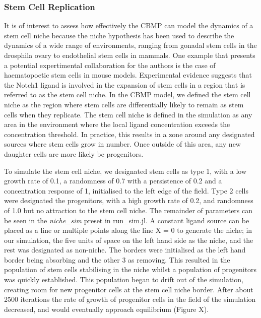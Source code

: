\documentclass[11.5pt]{article}
\begin{document}
\begin{figure}[H]
\centering
\end{figure}


\subsubsection{Stem Cell Replication}
It is of interest to assess how effectively the CBMP can model the 
dynamics of a stem cell niche because the niche hypothesis has been used 
to describe the dynamics of a wide range of environments, ranging from 
gonadal stem cells in the drosphila ovary to endothelial stem cells in 
mammals. One example that presents a potential expertimental 
collaboration for the authors is the case of haematopoetic stem cells in 
mouse models. Experimental evidence suggests that the Notch1 ligand is 
involved in the expansion of stem cells in a region that is referred to 
as the stem cell niche. In the CBMP model, we defined the stem cell 
niche as the region where stem cells are differentially likely to remain 
as stem cells when they replicate. The stem cell niche is defined in the 
simulation as any area in the environment where the local ligand 
concentration exceeds the concentration threshold. In practice, this 
results in a zone around any designated sources where stem cells grow in 
number. Once outside of this area, any new daughter cells are more 
likely be progenitors. 



To simulate the stem cell niche, we designated stem cells as type 1, 
with a low growth rate of 0.1, a randomness of 0.7 with a persistence of 
0.2 and a concentration response of 1, initialised to the left edge of 
the field. Type 2 cells were designated the progenitors, with a high 
growth rate of 0.2, and randomness of 1.0 but no attraction to the stem 
cell niche. The remainder of parameters can be seen in the {\itshape 
niche\_sim} preset in run\_sim.jl. A constant ligand source can be 
placed as a line or multiple points along the line X = 0 to generate the 
niche; in our simulation, the five units of space on the left hand side 
as the niche, and the rest was designated as non-niche. The borders were 
initialised as the left hand border being absorbing and the other 3 as 
removing. This resulted in the population of stem cells stabilising in 
the niche whilst a population of progenitors was quickly established. 
This population began to drift out of the simulation, creating room for 
new progenitor cells at the stem cell niche border. After about 2500 
iterations the rate of growth of progenitor cells in the field of the 
simulation decreased, and would eventually approach equilibrium (Figure 
X).
\end{document}
